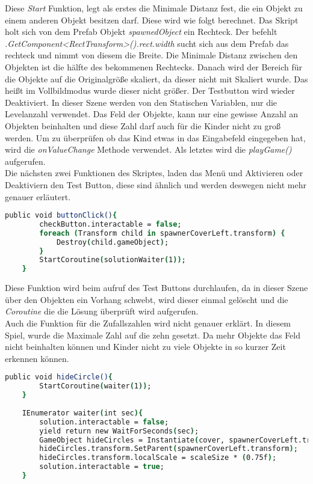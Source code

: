 Diese \textit{Start} Funktion, legt als erstes die Minimale Distanz fest, die ein Objekt zu einem anderen Objekt besitzen darf. Diese wird wie folgt berechnet. Das Skript holt sich von dem Prefab Objekt \textit{spawnedObject} ein Rechteck. Der befehlt \textit{.GetComponent<RectTransform>().rect.width} sucht sich aus dem Prefab das rechteck und nimmt von diesem die Breite. Die Minimale Distanz zwischen den Objekten ist die hälfte des bekommenen Rechtecks. Danach wird der Bereich für die Objekte auf die Originalgröße skaliert, da dieser nicht mit Skaliert wurde. Das heißt im Vollbildmodus wurde dieser nicht größer. Der Testbutton wird wieder Deaktiviert. In dieser Szene werden von den Statischen Variablen, nur die Levelanzahl verwendet. Das Feld der Objekte, kann nur eine gewisse Anzahl an Objekten beinhalten und diese Zahl darf auch für die Kinder nicht zu groß werden. Um zu überprüfen ob das Kind etwas in das Eingabefeld eingegeben hat, wird die \textit{onValueChange} Methode verwendet. Als letztes wird die \textit{playGame()} aufgerufen.\\
Die nächsten zwei Funktionen des Skriptes, laden das Menü und Aktivieren oder Deaktiviern den Test Button, diese sind ähnlich und werden deswegen nicht mehr genauer erläutert.\\
\begin{lstlisting}[language=csh, caption={lightningView.cs buttonClick-Funktion}]
	public void buttonClick(){
		checkButton.interactable = false;
		foreach (Transform child in spawnerCoverLeft.transform) {
			Destroy(child.gameObject);
		}
		StartCoroutine(solutionWaiter(1));
	}
\end{lstlisting}
Diese Funktion wird beim aufruf des Test Buttons durchlaufen, da in dieser Szene über den Objekten ein Vorhang schwebt, wird dieser einmal gelöscht und die \textit{Coroutine} die die Lösung überprüft wird aufgerufen.\\
Auch die Funktion für die Zufallszahlen wird nicht genauer erklärt. In diesem Spiel, wurde die Maximale Zahl auf die zehn gesetzt. Da mehr Objekte das Feld nicht beinhalten können und Kinder nicht zu viele Objekte in so kurzer Zeit erkennen können.\\
\begin{lstlisting}[language=csh, caption={hideCircle.cs buttonClick-Funktion}]
	public void hideCircle(){
		StartCoroutine(waiter(1));
	}
	
	IEnumerator waiter(int sec){
		solution.interactable = false;
		yield return new WaitForSeconds(sec);
		GameObject hideCircles = Instantiate(cover, spawnerCoverLeft.transform.position, Quaternion.identity);
		hideCircles.transform.SetParent(spawnerCoverLeft.transform);
		hideCircles.transform.localScale = scaleSize * (0.75f);
		solution.interactable = true;
	}
\end{lstlisting}
